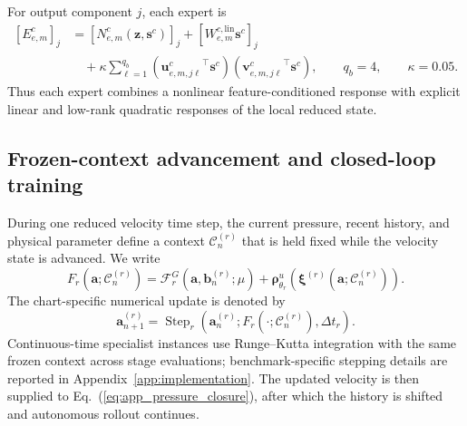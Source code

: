 \documentclass{article}
\def\plaineqref#1{\ref{#1}}
\begin{document}
For output component $j$, each expert is
\begin{align}
  \left[E_{e,m}^c\right]_j
  &=
  \left[
    N_{e,m}^c
    \left(
      \bm z,\bm s^c
    \right)
  \right]_j
  +
  \left[
    W_{e,m}^{c,\mathrm{lin}}
    \bm s^c
  \right]_j
  \nonumber\\
  &\quad+
  \kappa
  \sum_{\ell=1}^{q_b}
  \left(
    {\bm u_{e,m,j\ell}^c}^{\top}
    \bm s^c
  \right)
  \left(
    {\bm v_{e,m,j\ell}^c}^{\top}
    \bm s^c
  \right),
  \qquad
  q_b=4,
  \qquad
  \kappa=0.05.
  \label{eq:app_structured_expert}
\end{align}
Thus each expert combines a nonlinear feature-conditioned response with
explicit linear and low-rank quadratic responses of the local reduced state.


\subsection{Frozen-context advancement and closed-loop training}

During one reduced velocity time step, the current pressure, recent history, and
physical parameter define a context $\mathcal C_n^{(r)}$ that is held fixed
while the velocity state is advanced. We write
\begin{equation}
  F_r
  \left(
    \bm a;\mathcal C_n^{(r)}
  \right)
  =
  \mathcal F_r^G
  \left(
    \bm a,\bm b_n^{(r)};\mu
  \right)
  +
  \bm\rho^u_{\theta_r}
  \left(
    \bm\xi^{(r)}
    \left(
      \bm a;\mathcal C_n^{(r)}
    \right)
  \right).
  \label{eq:app_frozen_context_rhs}
\end{equation}
The chart-specific numerical update is denoted by
\begin{equation}
  \bm a_{n+1}^{(r)}
  =
  \operatorname{Step}_r
  \left(
    \bm a_n^{(r)};
    F_r(\cdot;\mathcal C_n^{(r)}),
    \Delta t_r
  \right).
  \label{eq:app_specialist_step}
\end{equation}
Continuous-time specialist instances use Runge--Kutta integration with the
same frozen context across stage evaluations; benchmark-specific stepping
details are reported in Appendix~\ref{app:implementation}.
The updated velocity is then supplied to
Eq.~(\plaineqref{eq:app_pressure_closure}), after which the history is
shifted and autonomous rollout continues.
\end{document}
